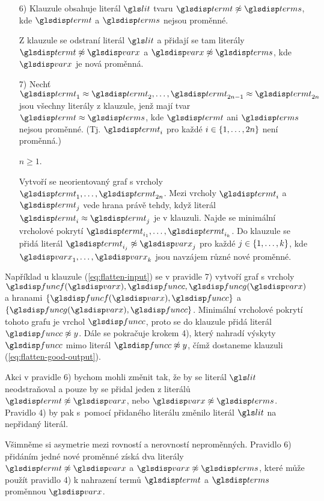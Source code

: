 {\begin{itemize}
\action{} Do klauzule se přidá literál $\term \not\approx \var$, kde
$\var$ je nová proměnná.

\item[6)]
\assumpt{} Klauzule obsahuje literál $\lit$ tvaru
$\term \not\approx \termS$, kde $\term$ a $\termS$ nejsou
proměnné.

\action{} Z klauzule se odstraní literál $\lit$ a přidají
se tam literály $\term \not\approx \var$ a $\var \not\approx \termS$,
kde $\var$ je nová proměnná.

\item[7)]
Nechť
$\term_1 \approx \term_2 \comdots \term_{2n-1} \approx \term_{2n}$
jsou všechny literály z klauzule, jenž mají tvar $\term \approx \termS$,
kde $\term$ ani $\termS$ nejsou proměnné.
(Tj. $\term_i$ pro každé $i \in \{ 1 , \ldots, 2n \}$ není proměnná.)

\assumpt{} $n \ge 1$.

\action{} Vytvoří se neorientovaný graf s vrcholy
$\term_1 \comdots \term_{2n}$. Mezi vrcholy $\term_i$ a $\term_j$ vede hrana
právě tehdy, když literál $\term_i \approx \term_j$ je v klauzuli.
Najde se minimální vrcholové pokrytí $\term_{i_1} \comdots \term_{i_k}$.
Do klauzule se přidá literál $\term_{i_j} \not\approx \var_j$ pro
každé $j \in \{ 1 , \ldots, k \}$, kde $\var_1 \comdots \var_k$ jsou
navzájem různé nové proměnné.
\end{itemize}
}

Například u klauzule (\ref{eq:flatten-input}) se v pravidle 7)
vytvoří graf s vrcholy $\func(\var), \funcC, \funcG(\var)$
a hranami $\{ \func(\var), \funcC \}$ a $\{ \funcG(\var), \funcC \}$.
Minimální vrcholové pokrytí tohoto grafu je vrchol $\funcC$,
proto se do klauzule přidá literál $\funcC \not\approx y$.
Dále se pokračuje krokem 4), který nahradí výskyty $\funcC$ mimo literál
$\funcC \not\approx y$, čímž dostaneme klauzuli
(\ref{eq:flatten-good-output}).

Akci v pravidle 6) bychom mohli změnit tak, že by se literál $\lit$
neodstraňoval a pouze by se přidal jeden z literálů
$\term \not\approx \var$, nebo $\var \not\approx \termS$.
Pravidlo 4) by pak s~pomocí přidaného literálu změnilo literál $\lit$
na nepřidaný literál.

Všimněme si asymetrie mezi rovností a nerovností neproměnných.
Pravidlo 6) přidáním jedné nové proměnné získá
dva literály $\term \not\approx \var$ a $\var \not\approx \termS$,
které může použít pravidlo 4) k nahrazení termů $\term$ a $\termS$
proměnnou $\var$.

